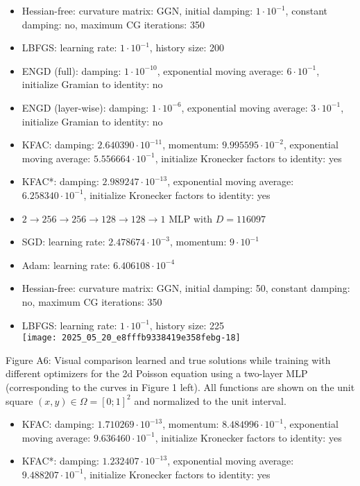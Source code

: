 \documentclass[10pt]{article}
\begin{document}
\begin{itemize}
  \item Hessian-free: curvature matrix: GGN, initial damping: $1 \cdot 10^{-1}$, constant damping: no, maximum CG iterations: 350
  \item LBFGS: learning rate: $1 \cdot 10^{-1}$, history size: 200
  \item ENGD (full): damping: $1 \cdot 10^{-10}$, exponential moving average: $6 \cdot 10^{-1}$, initialize Gramian to identity: no
  \item ENGD (layer-wise): damping: $1 \cdot 10^{-6}$, exponential moving average: $3 \cdot 10^{-1}$, initialize Gramian to identity: no
  \item KFAC: damping: $2.640390 \cdot 10^{-11}$, momentum: $9.995595 \cdot 10^{-2}$, exponential moving average: $5.556664 \cdot 10^{-1}$, initialize Kronecker factors to identity: yes
  \item KFAC*: damping: $2.989247 \cdot 10^{-13}$, exponential moving average: $6.258340 \cdot 10^{-1}$, initialize Kronecker factors to identity: yes
  \item $2 \rightarrow 256 \rightarrow 256 \rightarrow 128 \rightarrow 128 \rightarrow 1$ MLP with $D=116097$
  \item SGD: learning rate: $2.478674 \cdot 10^{-3}$, momentum: $9 \cdot 10^{-1}$
  \item Adam: learning rate: $6.406108 \cdot 10^{-4}$
  \item Hessian-free: curvature matrix: GGN, initial damping: 50, constant damping: no, maximum CG iterations: 350
  \item LBFGS: learning rate: $1 \cdot 10^{-1}$, history size: 225\\
\texttt{[image: 2025\_05\_20\_e8fffb9338419e358febg-18]}
\end{itemize}

Figure A6: Visual comparison learned and true solutions while training with different optimizers for the 2d Poisson equation using a two-layer MLP (corresponding to the curves in Figure 1 left). All functions are shown on the unit square $(x, y) \in \Omega=[0 ; 1]^{2}$ and normalized to the unit interval.

\begin{itemize}
  \item KFAC: damping: $1.710269 \cdot 10^{-13}$, momentum: $8.484996 \cdot 10^{-1}$, exponential moving average: $9.636460 \cdot 10^{-1}$, initialize Kronecker factors to identity: yes
  \item KFAC*: damping: $1.232407 \cdot 10^{-13}$, exponential moving average: $9.488207 \cdot 10^{-1}$, initialize Kronecker factors to identity: yes
\end{itemize}
\end{document}
